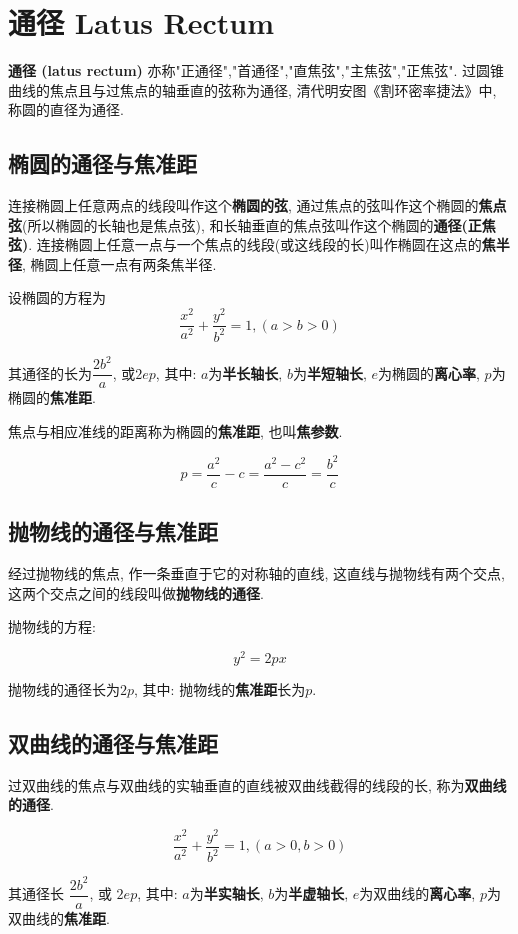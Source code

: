\chapter{通径 Latus Rectum}\label{ch:latus-rectum}

\textbf{通径 (latus rectum)} 亦称"正通径","首通径","直焦弦","主焦弦","正焦弦". 
过圆锥曲线的焦点且与过焦点的轴垂直的弦称为通径, 清代明安图《割环密率捷法》中, 称圆的直径为通径. 

\section{椭圆的通径与焦准距}

连接椭圆上任意两点的线段叫作这个\textbf{椭圆的弦}, 
通过焦点的弦叫作这个椭圆的\textbf{焦点弦}(所以椭圆的长轴也是焦点弦), 
和长轴垂直的焦点弦叫作这个椭圆的\textbf{通径(正焦弦)}. 
连接椭圆上任意一点与一个焦点的线段(或这线段的长)叫作椭圆在这点的\textbf{焦半径}, 
椭圆上任意一点有两条焦半径. 

设椭圆的方程为
\[
  \dfrac{x^2}{a^2}+\dfrac{y^2}{b^2}=1,(a > b > 0)
\]

其通径的长为$\dfrac{2b^2}{a}$, 或$2ep$,
其中: $a$为\textbf{半长轴长}, $b$为\textbf{半短轴长}, $e$为椭圆的\textbf{离心率}, $p$为椭圆的\textbf{焦准距}. 

焦点与相应准线的距离称为椭圆的\textbf{焦准距}, 也叫\textbf{焦参数}. 

\[
  p=\dfrac{a^2}{c}-c=\dfrac{a^2-c^2}{c}=\dfrac{b^2}{c}
\]

\section{抛物线的通径与焦准距}

经过抛物线的焦点, 作一条垂直于它的对称轴的直线, 这直线与抛物线有两个交点, 这两个交点之间的线段叫做\textbf{抛物线的通径}. 

抛物线的方程:

\[
  y^2=2px
\]

抛物线的通径长为$2p$, 其中: 抛物线的\textbf{焦准距}长为$p$. 

\section{双曲线的通径与焦准距}

过双曲线的焦点与双曲线的实轴垂直的直线被双曲线截得的线段的长, 称为\textbf{双曲线的通径}. 

\[
  \dfrac{x^2}{a^2}+\dfrac{y^2}{b^2}=1,(a >0, b > 0)
\]

其通径长 $\dfrac{2b^2}{a}$, 或 $2ep$, 
其中: $a$为\textbf{半实轴长}, $b$为\textbf{半虚轴长}, $e$为双曲线的\textbf{离心率}, $p$为双曲线的\textbf{焦准距}. 
